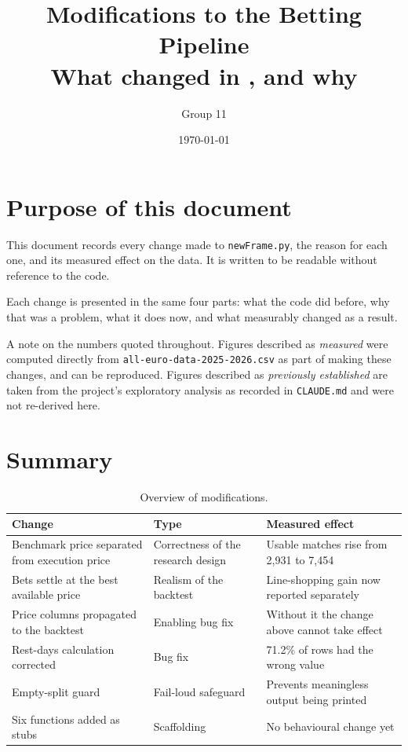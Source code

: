 \documentclass[11pt,a4paper]{article}
\title{Modifications to the Betting Pipeline\\
       \large What changed in \code{newFrame.py}, and why}
\author{Group 11}
\date{\today}
\newcommand{\code}[1]{\texttt{#1}}
\begin{document}
\maketitle

\section{Purpose of this document}

This document records every change made to \code{newFrame.py}, the reason
for each one, and its measured effect on the data. It is written to be
readable without reference to the code.

Each change is presented in the same four parts: what the code did before,
why that was a problem, what it does now, and what measurably changed as a
result.

A note on the numbers quoted throughout. Figures described as
\emph{measured} were computed directly from
\code{all-euro-data-2025-2026.csv} as part of making these changes, and can
be reproduced. Figures described as \emph{previously established} are taken
from the project's exploratory analysis as recorded in \code{CLAUDE.md} and
were not re-derived here.

\section{Summary}

\begin{table}[h]
\centering
\small
\begin{tabular}{@{}p{6.1cm}p{4.0cm}p{4.4cm}@{}}
\toprule
\textbf{Change} & \textbf{Type} & \textbf{Measured effect} \\
\midrule
Benchmark price separated from execution price
  & Correctness of the research design
  & Usable matches rise from 2{,}931 to 7{,}454 \\[4pt]
Bets settle at the best available price
  & Realism of the backtest
  & Line-shopping gain now reported separately \\[4pt]
Price columns propagated to the backtest
  & Enabling bug fix
  & Without it the change above cannot take effect \\[4pt]
Rest-days calculation corrected
  & Bug fix
  & 71.2\% of rows had the wrong value \\[4pt]
Empty-split guard
  & Fail-loud safeguard
  & Prevents meaningless output being printed \\[4pt]
Six functions added as stubs
  & Scaffolding
  & No behavioural change yet \\
\bottomrule
\end{tabular}
\caption{Overview of modifications.}
\end{table}
\end{document}
